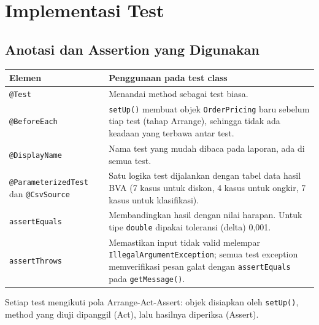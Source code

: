 \documentclass[11pt,a4paper]{article}
\newcommand{\hrow}{\rowcolor{headrow}}
\begin{document}
\section{Implementasi Test}

\subsection{Anotasi dan Assertion yang Digunakan}
\begin{center}
\begin{tabularx}{\textwidth}{@{}P{4.2cm}Y@{}}
\toprule
\hrow \textbf{Elemen} & \textbf{Penggunaan pada test class} \\
\midrule
\texttt{@Test} & Menandai method sebagai test biasa. \\
\texttt{@BeforeEach} & \texttt{setUp()} membuat objek \texttt{OrderPricing} baru sebelum tiap test (tahap Arrange), sehingga tidak ada keadaan yang terbawa antar test. \\
\texttt{@DisplayName} & Nama test yang mudah dibaca pada laporan, ada di semua test. \\
\texttt{@ParameterizedTest} dan \texttt{@CsvSource} & Satu logika test dijalankan dengan tabel data hasil BVA (7 kasus untuk diskon, 4 kasus untuk ongkir, 7 kasus untuk klasifikasi). \\
\texttt{assertEquals} & Membandingkan hasil dengan nilai harapan. Untuk tipe \texttt{double} dipakai toleransi (delta) 0,001. \\
\texttt{assertThrows} & Memastikan input tidak valid melempar \texttt{IllegalArgumentException}; semua test exception memverifikasi pesan galat dengan \texttt{assertEquals} pada \texttt{getMessage()}. \\
\bottomrule
\end{tabularx}
\end{center}
Setiap test mengikuti pola Arrange-Act-Assert: objek disiapkan oleh \texttt{setUp()}, method yang diuji dipanggil (Act), lalu hasilnya diperiksa (Assert).
\end{document}
